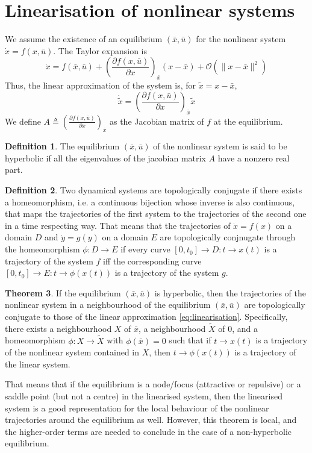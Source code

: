 \documentclass[12pt, openany]{report}
\theoremstyle{definition}
\newtheorem{thm}{Theorem}[chapter]
\newtheorem{definition}[thm]{Definition}
\begin{document}
\section{Linearisation of nonlinear systems}
We assume the existence of an equilibrium \((\bar x, \bar u)\) for the nonlinear system \(\dot x = f(x,\bar u)\). The Taylor expansion is
\begin{equation}
    \dot x = f(\bar x,\bar u) + \left(\frac{\partial f(x,\bar u)}{\partial x}\right)_{\bar x}(x-\bar x)+\mathcal{O}(\lVert x-\bar x\rVert^2)
\end{equation}
Thus, the linear approximation of the system is, for \(\tilde x = x-\bar x\),
\begin{equation}\label{eq:linearisation}
    \dot{\tilde{x}} = \left(\frac{\partial f(x,\bar u)}{\partial x}\right)_{\bar x}\tilde x
\end{equation}
We define \(A\triangleq \left(\frac{\partial f(x,\bar u)}{\partial x}\right)_{\bar x}\) as the Jacobian matrix of \(f\) at the equilibrium.
\begin{definition}
    The equilibrium \((\bar x,\bar u)\) of the nonlinear system is said to be hyperbolic if all the eigenvalues of the jacobian matrix \(A\) have a nonzero real part. 
\end{definition}
\begin{definition}
    Two dynamical systems are topologically conjugate if there exists a homeomorphism, i.e. a continuous bijection whose inverse is also continuous, that maps the trajectories of the first system to the trajectories of the second one in a time respecting way. That means that the trajectories of \(\dot x = f(x)\) on a domain \(D\) and \(\dot y=g(y)\) on a domain \(E\) are topologically conjnugate through the homeomorphism \(\phi:D\rightarrow E\) if every curve \([0,t_0]\rightarrow D:t\rightarrow x(t)\) is a trajectory of the system \(f\) iff the corresponding curve \([0,t_0]\rightarrow E:t\rightarrow\phi(x(t))\) is a trajectory of the system \(g\).
\end{definition}
\begin{thm}
    If the equilibrium \((\bar x,\bar u)\) is hyperbolic, then the trajectories of the nonlinear system in a neighbourhood of the equilibrium \((\bar x,\bar u)\) are topologically conjugate to those of the linear approximation \eqref{eq:linearisation}. Specifically, there exists a neighbourhood \(X\) of \(\bar x\), a neighbourhood \(\tilde X\) of 0, and a homeomorphism \(\phi:X\rightarrow\tilde X\) with \(\phi(\bar x)=0\) such that if \(t\rightarrow x(t)\) is a trajectory of the nonlinear system contained in \(X\), then \(t\rightarrow \phi(x(t))\) is a trajectory of the linear system.
\end{thm}
That means that if the equilibrium is a node/focus (attractive or repulsive) or a saddle point (but not a centre) in the linearised system, then the linearised system is a good representation for the local behaviour of the nonlinear trajectories around the equilibrium as well. However, this theorem is local, and the higher-order terms are needed to conclude in the case of a non-hyperbolic equilibrium. 
\end{document}
